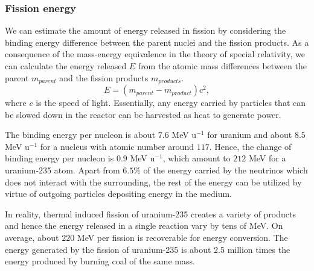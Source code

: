 \documentclass[nofootinbib,preprint,aps]{revtex4-1}
\begin{document}
        \subsubsection{Fission energy}
        We can estimate the amount of energy released in fission by considering the binding energy difference
        between the parent nuclei and the fission products. As a consequence of the mass-energy equivalence in the theory
        of special relativity, we can calculate the energy released $E$ from the atomic mass differences between the parent $m_{parent}$
        and the fission products $m_{products}$.
        \begin{equation}
            E = (m_{parent}-m_{product})c^2,
        \end{equation}
        where $c$ is the speed of light.
        Essentially, any energy carried by particles that can be slowed down 
        in the reactor can be harvested as heat to generate power.

        The binding energy per nucleon is about $7.6$ MeV u${}^{-1}$ for uranium and about $8.5$ MeV u${}^{-1}$
        for a nucleus with atomic number around $117$. Hence, the change of binding energy per nucleon is
        $0.9$ MeV u${}^{-1}$, which amount to $212$ MeV for a uranium-235 atom.
        Apart from $6.5\%$ of the energy carried by the neutrinos which does not interact with the surrounding,
        the rest of the energy can be utilized by virtue of outgoing particles depositing energy in the medium.

        In reality, thermal induced fission of uranium-235 creates a variety of products and hence the energy released
        in a single reaction vary by tens of MeV. On average, about $220$ MeV per fission is recoverable for energy conversion.
        The energy generated by the fission of uranium-235 is 
        about 2.5 million times the energy produced by burning coal of the same mass.\cite{e17}
\end{document}
